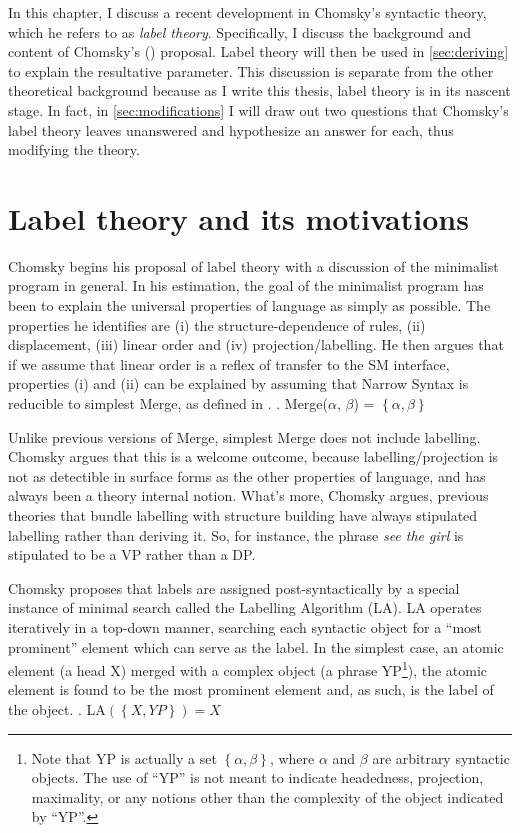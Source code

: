 \documentclass[MilwayThesis]{subfiles}
\begin{document}
In this chapter, I discuss a recent development in Chomsky's syntactic theory, which he refers to as \textit{label theory}.
Specifically, I discuss the background and content of Chomsky's (\citeyear{chomsky2013problems,chomsky2015problems}) proposal.
Label theory will then be used in \cref{sec:deriving} to explain the resultative parameter.
This discussion is separate from the other theoretical background because as I write this thesis, label theory is in its nascent stage.
In fact, in \cref{sec:modifications} I will draw out two questions that Chomsky's label theory leaves unanswered and hypothesize an answer for each, thus modifying the theory.
\section{Label theory and its motivations}
Chomsky begins his proposal of label theory with a discussion of the minimalist program in general.
In his estimation, the goal of the minimalist program has been to explain the universal properties of language as simply as possible.
The properties he identifies are (i) the structure-dependence of rules, (ii) displacement, (iii) linear order and (iv) projection/labelling.
He then argues that if we assume that linear order is a reflex of transfer to the SM interface, properties (i) and (ii) can be explained by assuming that Narrow Syntax is reducible to simplest Merge, as defined in \Next.
\ex. Merge($\alpha$, $\beta$) = $\left\{ \alpha, \beta \right\}$

Unlike previous versions of Merge, simplest Merge does not include labelling.
Chomsky argues that this is a welcome outcome, because labelling/projection is not as detectible in surface forms as the other properties of language, and has always been a theory internal notion.
What's more, Chomsky argues, previous theories that bundle labelling with structure building have always stipulated labelling rather than deriving it.
So, for instance, the phrase \textit{see the girl} is stipulated to be a VP rather than a DP.

Chomsky proposes that labels are assigned post-syntactically by a special instance of minimal search called the Labelling Algorithm (LA).
LA operates iteratively in a top-down manner, searching each syntactic object for a ``most prominent'' element which can serve as the label.
In the simplest case, an atomic element (a head X) merged with a complex object (a phrase YP\footnote{
		Note that YP is actually a set $\left\{ \alpha,\beta \right\}$, where $\alpha$ and $\beta$ are arbitrary syntactic objects.
		The use of ``YP'' is not meant to indicate headedness, projection, maximality, or any notions other than the complexity of the object indicated by ``YP''. 
}), the atomic element is found to be the most prominent element and, as such, is the label of the object.
\ex. LA$(\left\{ X, YP \right\}) = X$
\end{document}
